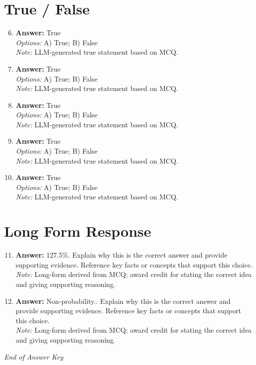 \documentclass[12pt]{article}
\begin{document}
\section*{True / False}
\begin{enumerate}[label=\arabic*.]
\setcounter{enumi}{5}
\item \textbf{Answer:} True
\\ \textit{Options:} A) True; B) False
\\ \textit{Note:} LLM-generated true statement based on MCQ.
\item \textbf{Answer:} True
\\ \textit{Options:} A) True; B) False
\\ \textit{Note:} LLM-generated true statement based on MCQ.
\item \textbf{Answer:} True
\\ \textit{Options:} A) True; B) False
\\ \textit{Note:} LLM-generated true statement based on MCQ.
\item \textbf{Answer:} True
\\ \textit{Options:} A) True; B) False
\\ \textit{Note:} LLM-generated true statement based on MCQ.
\item \textbf{Answer:} True
\\ \textit{Options:} A) True; B) False
\\ \textit{Note:} LLM-generated true statement based on MCQ.
\end{enumerate}

\section*{Long Form Response}
\begin{enumerate}[label=\arabic*.]
\setcounter{enumi}{10}
\item \textbf{Answer:} 127.5\%. Explain why this is the correct answer and provide supporting evidence. Reference key facts or concepts that support this choice.
\\ \textit{Note:} Long-form derived from MCQ; award credit for stating the correct idea and giving supporting reasoning.
\item \textbf{Answer:} Non-probability.. Explain why this is the correct answer and provide supporting evidence. Reference key facts or concepts that support this choice.
\\ \textit{Note:} Long-form derived from MCQ; award credit for stating the correct idea and giving supporting reasoning.
\end{enumerate}

\vfill
\noindent\textit{End of Answer Key}
\end{document}
